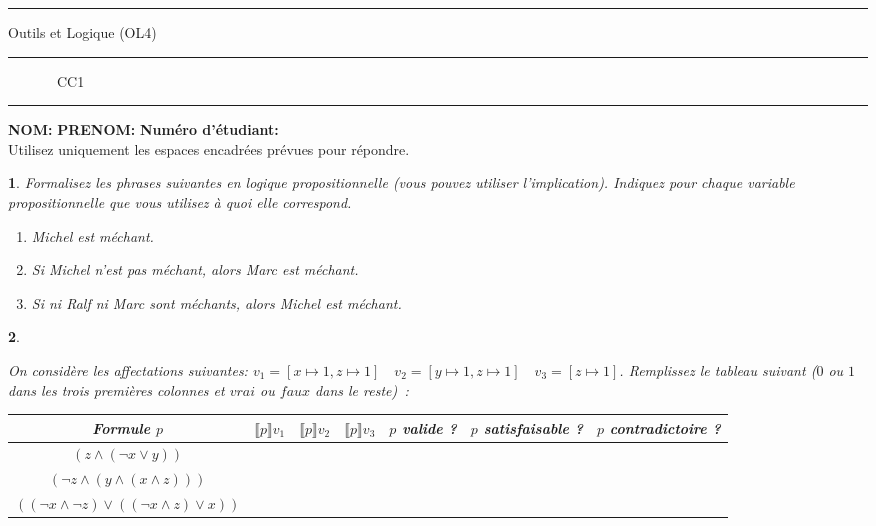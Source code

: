 \documentclass[a4paper,10pt,french]{article}
\newtheorem{exi}{}
\newenvironment{exo}{\begin{exi}\em}{\end{exi}}
\newcommand{\rsem}{\rrbracket}
\newcommand{\inte}[2]{\llbracket #1 \rsem {#2}}
\begin{document}
\vspace*{-1cm}
\hrule
\medbreak
\centerline{\textsf{O{\small utils} et L{\small ogique} (OL4)}}
\medbreak
\hrule
\medbreak
\centerline{\textsf{\phantom{(} ~~~~~~~CC1~~~~~~~\phantom{)}}}
\medbreak
\hrule

\bigskip
\bigskip

{\bf NOM:} \hspace*{4cm} {\bf PRENOM:} \hspace*{3cm} {\bf Numéro
  d'étudiant:}\\

Utilisez uniquement les espaces encadrées prévues pour répondre.

\begin{exo}
  Formalisez les phrases suivantes en logique propositionnelle
  (vous pouvez utiliser l'implication).
  Indiquez pour chaque variable propositionnelle que vous utilisez
  à quoi elle correspond.

  \begin{enumerate}
  \item Michel est méchant.
  \item Si Michel n'est pas méchant, alors Marc est méchant.
  \item Si ni Ralf ni Marc sont méchants, alors Michel est méchant.
  \end{enumerate}
  
 \framebox[\textwidth]{
  \rule[-0.4cm]{0mm}{4cm}
 }
 
  \end{exo}
  
\begin{exo}

  On considère les affectations suivantes: $v_1 = [ x\mapsto 1, z\mapsto 1 ] \quad
v_2= [ y\mapsto 1, z\mapsto 1 ] \quad
v_3= [ z\mapsto 1]$.
Remplissez le tableau suivant ($0$ ou $1$ dans les trois premières colonnes et $vrai$ ou $\mathit{faux}$ dans le reste)~:

\begin{tabular}{|c|c|c|c|c|c|c|}
  \hline
    Formule $p$ &$\inte{p}{v_1}$&$\inte{p}{v_2}$&$\inte{p}{v_3}$&$p$ valide ?&$p$ satisfaisable ?&$p$ contradictoire ?\\[0.5ex]
    \hline
    $(z \land (\neg x \vee y))$&&&&&&\\[0.5ex]
    \hline
    $(\neg z \land (y \land (x \land z)))$&&&&&&\\[0.5ex]
    \hline
    $((\neg x \land \neg z) \vee ((\neg x \land z) \vee x))$&&&&&&\\[0.5ex]
    \hline
  \end{tabular}
\end{exo}
\end{document}
